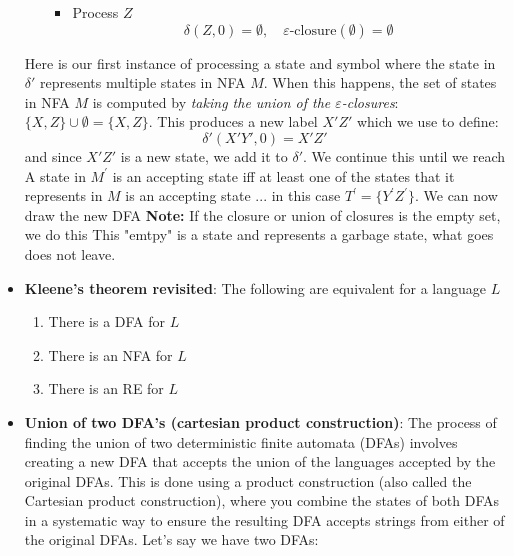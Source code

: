 \documentclass{report}
\begin{document}
\begin{itemize}
\begin{itemize}
\begin{itemize}
                \item Process $Z$
                    \[
                        \delta(Z, 0) = \emptyset, \quad \varepsilon\text{-closure}(\emptyset) = \emptyset
                    \]
            \end{itemize}
    \end{itemize}
    Here is our first instance of processing a state and symbol where the state in $\delta'$ represents multiple states in NFA $M$. When this happens, the set of states in NFA $M$ is computed by \textit{taking the union of the $\varepsilon$-closures}: $\{X, Z\} \cup \emptyset = \{X, Z\}$.
    \bigbreak \noindent 
    This produces a new label $X'Z'$ which we use to define:
    \[
        \delta'(X'Y', 0) = X'Z'
    \]
    and since $X'Z'$ is a new state, we add it to $\delta'$.
    \bigbreak \noindent 
    We continue this until we reach 
    \bigbreak \noindent 
    \bigbreak \noindent 
    A state in $M^{\prime}$ is an accepting state iff at least one of the states that it represents in $M$ is an accepting state ... in this case $T^{\prime}= \{Y^{\prime}Z^{\prime}\}$.
    \bigbreak \noindent 
    We can now draw the new DFA 
    \bigbreak \noindent 
    \bigbreak \noindent 
    \textbf{Note:} If the closure or union of closures is the empty set, we do this
    \bigbreak \noindent 
    \bigbreak \noindent 
    This "emtpy" is a state and represents a garbage state, what goes does not leave.
\item \textbf{Kleene's theorem revisited}: The following are equivalent for a language $L$
    \begin{enumerate}
        \item There is a DFA for $L$
        \item There is an NFA for $L$
        \item There is an RE for $L$
    \end{enumerate}
    \item \textbf{Union of two DFA's (cartesian product construction)}:
        The process of finding the union of two deterministic finite automata (DFAs) involves creating a new DFA that accepts the union of the languages accepted by the original DFAs. This is done using a product construction (also called the Cartesian product construction), where you combine the states of both DFAs in a systematic way to ensure the resulting DFA accepts strings from either of the original DFAs.
        \bigbreak \noindent 
        Let's say we have two DFAs:

\end{itemize}
\end{document}

